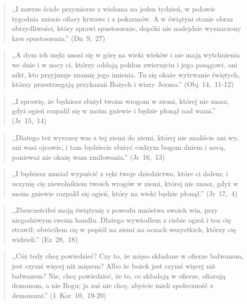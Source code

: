 \documentclass[10pt,a4paper,oneside]{article}
\begin{document}
\begin{quote}
,,I zawrze ścisłe przymierze z wieloma na jeden tydzień, w połowie tygodnia zniesie ofiary krwawe i z pokarmów. A w świątyni stanie obraz obrzydliwości, który sprawi spustoszenie, dopóki nie nadejdzie wyznaczony kres spustoszenia.'' (Dn~9,~27)
\end{quote}
\begin{quote}
,,A dym ich męki unosi się w górę na wieki wieków i nie mają wytchnienia we dnie i w nocy ci, którzy oddają pokłon zwierzęciu i jego posągowi, ani nikt, kto przyjmuje znamię jego imienia. Tu się okaże wytrwanie świętych, którzy przestrzegają przykazań Bożych i wiary Jezusa.'' (Obj~14,~11-12)
\end{quote}
\begin{quote}
,,I sprawię, że będziesz służył twoim wrogom w ziemi, której nie znasz, gdyż ogień rozpalił się w moim gniewie i będzie płonął nad wami.'' (Jr~15,~14)
\end{quote}
\begin{quote}
,,Dlatego też wyrzucę was z tej ziemi do ziemi, której nie znaliście ani wy, ani wasi ojcowie, i tam będziecie służyć cudzym bogom dniem i nocą, ponieważ nie okażę wam zmiłowania.'' (Jr~16,~13)
\end{quote}
\begin{quote}
,,I będziesz musiał wypuścić z ręki twoje dziedzictwo, które ci dałem; i uczynię cię niewolnikiem twoich wrogów w ziemi, której nie znasz, gdyż w moim gniewie rozpalił się ogień, który na wieki będzie płonął.'' (Jr~17,~4)
\end{quote}
\begin{quote}
,,Zbezcześciłeś moją świątynię z powodu mnóstwa swoich win, przy niegodziwym swoim handlu. Dlatego wywiodłem z ciebie ogień i ten cię strawił; obróciłem cię w popiół na ziemi na oczach wszystkich, którzy cię widzieli.'' (Ez~28,~18)
\end{quote}
\begin{quote}
,,Cóż tedy chcę powiedzieć? Czy to, że mięso składane w ofierze bałwanom, jest czymś więcej niż mięsem? Albo że bożek jest czymś więcej niż bałwanem? Nie, chcę powiedzieć, że to, co składają w ofierze, ofiarują demonom, a nie Bogu; ja zaś nie chcę, abyście mieli społeczność z demonami.'' (1~Kor~10,~19-20)
\end{quote}
\end{document}
